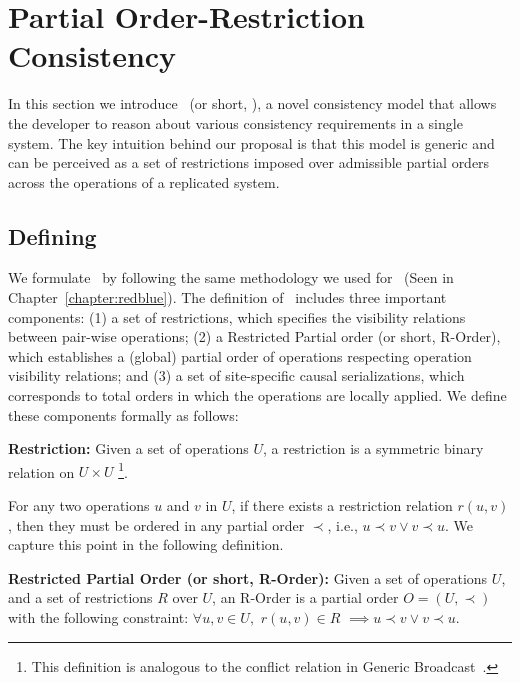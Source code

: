 \section{Partial Order-Restriction Consistency}
\label{ch:por:sect:pordef}
In this section we introduce \PRCNF\ (or short, \PRCN), a novel consistency model that allows
the developer to reason about various consistency requirements in a single
system. The key intuition behind our proposal is that this model is generic and 
can be perceived as a set of restrictions imposed over admissible partial orders 
across the operations of a replicated system.

\subsection{Defining \PRCN}
We formulate \PRCN\ by following the same methodology we used for \RBCN\ (Seen in Chapter~\ref{chapter:redblue}).
The definition of \PRCN\ includes three important components: (1) a set of restrictions, which
specifies the visibility relations between pair-wise operations; (2) a Restricted Partial order (or short, R-Order), which
establishes a (global) partial order of operations respecting operation visibility relations; and (3) a set of site-specific causal serializations,
which corresponds to total orders in which the operations are locally applied. We define
these components formally as follows:

\begin{mydef}
\textbf{Restriction: } Given a set of operations $U$, a restriction is a symmetric binary relation on $U\times U$
\footnote{This definition is analogous to the conflict relation in Generic Broadcast~\cite{Pedone99genericbroadcast}.}.
\label{def:restr}
\end{mydef}

For any two operations $u$ and $v$ in $U$, if there exists a restriction relation $r(u, v)$, 
then they must be ordered in any partial order $\prec$, i.e., $u\prec v \vee v\prec u$. We capture this point
in the following definition.

\begin{mydef}
\textbf{Restricted Partial Order (or short, R-Order): } Given a
set of operations $U$, and a set of restrictions $R$ over $U$, an R-Order is a partial order
$O = (U, \prec)$ with the following constraint: $\forall u, v\in U,$ $r(u, v)\in R$ $\implies u\prec v\vee v\prec u$.
\label{def:rorder}
\end{mydef}

